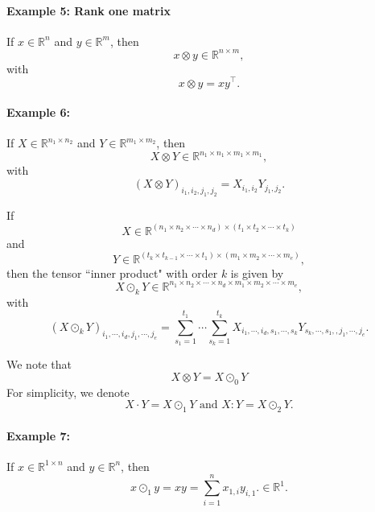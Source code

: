 \paragraph{Example 5: Rank one matrix} If $x \in \mathbb{R}^n$ and $y \in \mathbb{R}^m$, then
\begin{equation}\label{3DColorImage}
x \otimes y \in \mathbb{R}^{n \times m},
\end{equation}
with 
\begin{equation}
x \otimes y = x y^\top.
\end{equation}

\paragraph{Example 6: } If $X \in \mathbb{R}^{n_1\times n_2}$ and $Y \in \mathbb{R}^{m_1 \times m_2}$, then
\begin{equation}\label{3DColorImage}
X \otimes Y \in \mathbb{R}^{n_1 \times n_1 \times m_1 \times m_1},
\end{equation}
with 
\begin{equation}
(X \otimes Y)_{i_1, i_2, j_1 ,j_2}  =  X_{i_1, i_2} Y_{j_1, j_2}.
\end{equation}

\begin{definition}
If 
$$
X \in \mathbb R^{(n_1 \times n_2 \times \cdots \times n_d )\times
  (t_1\times t_2\times\cdots\times t_k)}
$$ and 
$$
Y\in \mathbb R^{ (t_k\times t_{k-1}\times\cdots\times t_1)\times
  (m_1 \times m_2 \times \cdots \times m_e)},
$$
then the tensor ``inner product" with order $k$ is given by
\begin{equation}
X\odot_k Y \in \mathbb R^{n_1 \times n_2 \times \cdots \times n_d \times m_1 \times m_2 \times \cdots \times m_e},
\end{equation}
with 
\begin{equation}
(X\odot_k Y)_{i_1, \cdots, i_d, j_1, \cdots,j_e} 
=\sum_{s_1=1}^{t_1} \cdots\sum_{s_k=1}^{t_k}X_{i_1, \cdots, i_d, s_1,\cdots,s_k} Y_{s_k,\cdots,s_1,,j_1, \cdots, j_e}.
\end{equation}
\end{definition}
We note that
$$
X\otimes Y =X\odot_0Y
$$
For simplicity, we denote
\begin{equation}
X\cdot Y=X\odot_1Y \mbox{ and } X:Y=X\odot_2 Y  .
\end{equation}
\paragraph{Example 7: } If $x \in \mathbb{R}^{1\times n}$ and $y \in \mathbb{R}^{n}$, then
\begin{equation}\label{3DColorImage}
x \odot_1 y =xy= \sum_{i=1}^n x_{1,i} y_{i,1}.\in \mathbb{R}^{1}. 
\end{equation}


